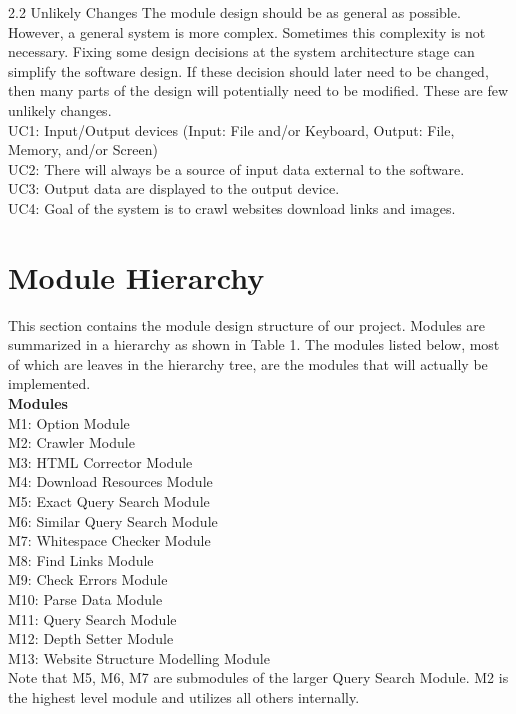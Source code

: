 \documentclass[titlepage]{article}
\begin{document}
2.2 Unlikely Changes
The module design should be as general as possible. However, a general system is more complex. Sometimes this complexity is not necessary. Fixing some design decisions at the system architecture stage can simplify the software design. If these decision should later need to be changed, then many parts of the design will potentially need to be modified.
These are few unlikely changes.\\

\noindent
UC1: Input/Output devices (Input: File and/or Keyboard, Output: File, Memory, and/or
Screen)\\
UC2: There will always be a source of input data external to the software.\\
UC3: Output data are displayed to the output device.\\
UC4: Goal of the system is to crawl websites download links and images.\\

\section{Module Hierarchy}
This section contains the module design structure of our project. Modules are summarized in a hierarchy as shown in Table 1. The modules listed below, most of which are leaves in the hierarchy tree, are the modules that will actually be implemented.
\\

\textbf{Modules}\\

\noindent
M1: Option Module\\
M2: Crawler Module\\
M3: HTML Corrector Module\\
M4: Download Resources Module\\
M5: Exact Query Search Module\\
M6: Similar Query Search Module\\
M7: Whitespace Checker Module\\
M8: Find Links Module\\
M9: Check Errors Module\\
M10: Parse Data Module\\
M11: Query Search Module\\
M12: Depth Setter Module\\
M13: Website Structure Modelling Module\\

Note that M5, M6, M7 are submodules of the larger Query Search Module. M2 is the highest level module and utilizes all others internally.\\
\end{document}

